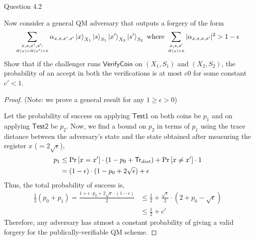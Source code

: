\begin{solution}{Question 4.2}\label{ques:42}
    \begin{question}
        Now consider a general QM adversary that outputs a forgery of the form
        \begin{equation}
            \sum_{\underset{H(x) = H(x') = h}{x, s, x', s':}} \alpha_{x, s, x', s'}\ket{x}_{X_1}\ket{s}_{S_1}\ket{x'}_{X_2}\ket{s'}_{S_2}\text{ where }\sum_{\underset{H(x) = h}{x, s, s'}} |\alpha_{x, s, x, s'}|^2 > 1 - \epsilon
        \end{equation}
        Show that if the challenger runs $\mathsf{VerifyCoin}$ on $(X_1, S_1)$ and $(X_2, S_2)$, the probability of an accept in both the verifications is at most c0 for some constant $c' < 1$.
    \end{question}
    \tcblower{}
    \begin{proof}
        (Note: we prove a general result for any $1 \geq \epsilon > 0$)\par
        Let the probability of success on applying $\mathsf{Test1}$ on both coins be $p_1$ and on applying $\mathsf{Test2}$ be $p_2$. Now, we find a bound on $p_2$ in terms of $p_1$ using the trace distance between the adversary's state and the state obtained after measuring the register $x$ ($=2\sqrt{\epsilon}$), 
        \begin{equation}
            \begin{split}
                p_1 &\leq \Pr\left[ x = x' \right]\cdot\left(1 - p_0 + \mathsf{Tr}_{dist}\right) + \Pr\left[ x \neq x' \right]\cdot 1\\
                    &= (1 - \epsilon)\cdot(1 - p_0 + 2\sqrt{\epsilon}) + \epsilon
            \end{split}
        \end{equation}
        Thus, the total probability of success is,
        \begin{equation}
            \begin{split}
                \frac{1}{2}(p_0 + p_1) = \frac{1 + \epsilon\cdot p_0 + 2\sqrt{\epsilon}\cdot(1 - \epsilon)}{2}
                                      &\leq \frac{1}{2} + \frac{\sqrt{\epsilon}}{2}\cdot(2 + p_0 - \sqrt{\epsilon})\\
                                      &\leq \frac{1}{2} + c'
            \end{split}
        \end{equation}
        Therefore, any adversary has atmost a constant probability of giving a valid forgery for the publically-verifiable QM scheme.
    \end{proof}
\end{solution}
 
